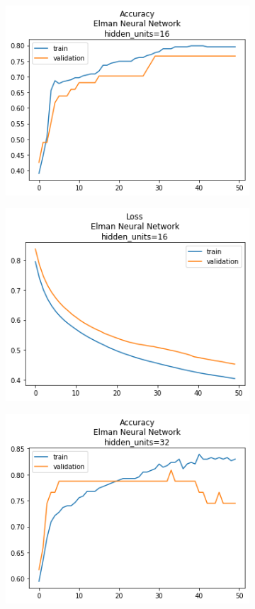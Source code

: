 \documentclass[12pt, a4paper]{article}
\begin{document}
\begin{figure}
\begin{subfigure}{0.45\linewidth}
        \includegraphics[width=0.9\linewidth]{images/q1/elman/acc_Elman Neural Networkhidden_units=16.png}
    \end{subfigure}
    \hfill
    \begin{subfigure}{0.45\linewidth}
        \includegraphics[width=0.9\linewidth]{images/q1/elman/loss_Elman Neural Networkhidden_units=16.png}
    \end{subfigure}
    \begin{subfigure}{0.45\linewidth}
        \includegraphics[width=0.9\linewidth]{images/q1/elman/acc_Elman Neural Networkhidden_units=32.png}

\end{subfigure}
\end{figure}
\end{document}
